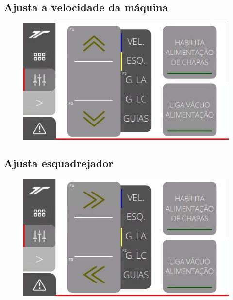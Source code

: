 \subsection{\small Ajusta a velocidade da máquina}
\begin{figure}
    \centering
    \includegraphics{src/imagesICV/11-KTP400-Feeder/5.png}
\end{figure}

\newpage
\thispagestyle{fancy}
\vspace{\fill}
\subsection{\small Ajusta esquadrejador}
\begin{figure}
    \centering
    \includegraphics{src/imagesICV/11-KTP400-Feeder/6.png}
\end{figure}

\newpage
\thispagestyle{fancy}
\vspace{\fill}
